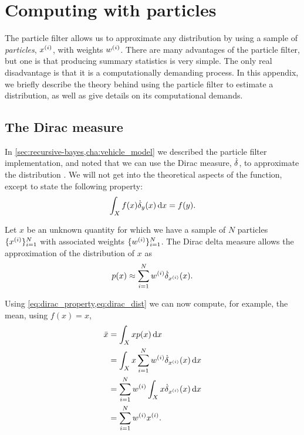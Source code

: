 \chapter{Computing with particles}
\label{app:computing-with-particles}

\phantom{\gps{}\gps{}\gps{}}

The particle filter allows us to approximate any distribution by using a sample of \emph{particles}, $x^{(i)}$, with weights $w^{(i)}$. There are many advantages of the particle filter, but one is that producing summary statistics is very simple. The only real disadvantage is that it is a computationally demanding process. In this appendix, we briefly describe the theory behind using the particle filter to estimate a distribution, as well as give details on its computational demands.


\section{The Dirac measure}
\label{app:dirac-delta-measure}

In \cref{sec:recursive-bayes,cha:vehicle_model} we described the particle filter implementation, and noted that we can use the Dirac measure, $\dot\delta$, to approximate the distribution \citep{Benedetto_1996}. We will not get into the theoretical aspects of the function, except to state the following property:
\begin{equation}
\label{eq:dirac_property}
\int_X f(x) \dot\delta_y(x)\,\mathrm{d}x = f(y).
\end{equation}

Let $x$ be an unknown quantity for which we have a sample of $N$ particles $\{x^{(i)}\}_{i=1}^N$ with associated weights $\{w^{(i)}\}_{i=1}^N$. The Dirac delta measure allows the approximation of the distribution of $x$ as
\begin{equation}
\label{eq:dirac_dist}
p(x) \approx \sum_{i=1}^N w^{(i)} \dot\delta_{x^{(i)}}(x).
\end{equation}


Using \cref{eq:dirac_property,eq:dirac_dist} we can now compute, for example, the mean, using $f(x) = x$,
\begin{equation}
\label{eq:dirac_mean}
\begin{split}
\bar x &= \int_X x p(x) \,\mathrm{d}x \\
&= \int_X x \sum_{i=1}^N w^{(i)} \dot\delta_{x^{(i)}}(x) \,\mathrm{d}x \\
&= \sum_{i=1}^N w^{(i)} \int_X x \dot\delta_{x^{(i)}}(x) \,\mathrm{d}x \\
&= \sum_{i=1}^N w^{(i)} x^{(i)}.
\end{split}
\end{equation}



